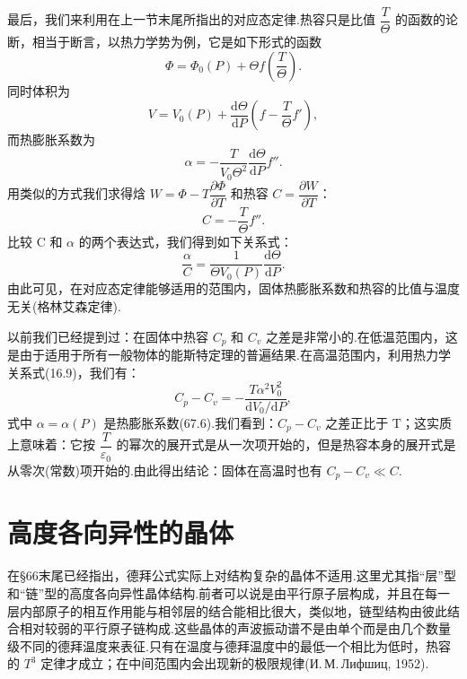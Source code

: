 最后，我们来利用在上一节末尾所指出的对应态定律.热容只是比值 $\dfrac{T}{\Theta}$ 的函数的论断，相当于断言，以热力学势为例，它是如下形式的函数
\begin{equation}
  \Phi=\Phi_0(P)+\Theta f\left(\frac{T}{\Theta}\right).
\end{equation}
同时体积为
\begin{equation*}
  V=V_0(P)+\frac{\mathrm{d}\Theta}{\mathrm{d}P}\left(f-\frac{T}{\Theta}f'\right),
\end{equation*}
而热膨胀系数为
\begin{equation*}
  \alpha=-\frac{T}{V_0\Theta^2}\frac{\mathrm{d}\Theta}{\mathrm{d}P}f''.
\end{equation*}
用类似的方式我们求得焓 $W=\Phi-T\dfrac{\partial\Phi}{\partial T}$ 和热容 $C=\dfrac{\partial W}{\partial T}$：
\begin{equation*}
  C=-\frac{T}{\Theta}f''.
\end{equation*}
比较 C 和 $\alpha$ 的两个表达式，我们得到如下关系式：
\begin{equation}
  \frac{\alpha}{C}=\frac{1}{\Theta V_0(P)}\frac{\mathrm{d}\Theta}{\mathrm{d}P}.
\end{equation}
由此可见，在对应态定律能够适用的范围内，固体热膨胀系数和热容的比值与温度无关(格林艾森定律).

以前我们已经提到过：在固体中热容 $C_p$ 和 $C_v$ 之差是非常小的.在低温范围内，这是由于适用于所有一般物体的能斯特定理的普遍结果.在高温范围内，利用热力学关系式(16.9)，我们有：
\begin{equation*}
  C_p-C_v=-\frac{T\alpha^2V_0^2}{\mathrm{d}V_0/\mathrm{d}P},
\end{equation*}
式中 $\alpha=\alpha(P)$ 是热膨胀系数(67.6).我们看到：$C_p-C_v$ 之差正比于 T；这实质上意味着：它按 $\dfrac{T}{\varepsilon_0}$ 的幂次的展开式是从一次项开始的，但是热容本身的展开式是从零次(常数)项开始的.由此得出结论：固体在高温时也有 $C_p-C_v\ll C$.

\section{高度各向异性的晶体}

在§66末尾已经指出，德拜公式实际上对结构复杂的晶体不适用.这里尤其指“层”型和“链”型的高度各向异性晶体结构.前者可以说是由平行原子层构成，并且在每一层内部原子的相互作用能与相邻层的结合能相比很大，类似地，链型结构由彼此结合相对较弱的平行原子链构成.这些晶体的声波振动谱不是由单个而是由几个数量级不同的德拜温度来表征.只有在温度与德拜温度中的最低一个相比为低时，热容的 $T^3$ 定律才成立；在中间范围内会出现新的极限规律(И.\,М.\,Лифшиц, 1952).


